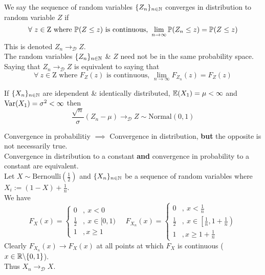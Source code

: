 \documentclass[11pt,a4paper]{article}
\begin{document}
We say the sequence of random variables $\{Z_n\}_{n\in\mathbb{N}}$ converges in distribution to random variable $Z$ if
$$\forall\ z\in\text{Z where }\mathbb{P}(Z\leq z)\text{ is continuous, }\lim_{n\to\infty}\mathbb{P}(Z_n\leq z)=\mathbb{P}(Z\leq z)$$
\nb This is denoted $Z_n\to_\mathcal{D} Z$.\\
\nb The random variables $\{Z_n\}_{n\in\mathbb{N}}$ \& $Z$ need not be in the same probability space.\\

Saying that $Z_n\to_\mathcal{D} Z$ is equivalent to saying that
$$\forall\ z\in\text{Z where }F_Z(z)\text{ is continuous, }\lim_{n\to\infty}F_{Z_n}(z)=F_Z(z)$$

If $\{X_n\}_{n\in\mathbb{N}}$ are idependent \& identically distributed, $\mathbb{E}(X_1)=\mu<\infty$ and $\mathrm{Var}(X_1)=\sigma^2<\infty$ then
$$\frac{\sqrt{n}}{\sigma}(Z_n-\mu)\to_\mathcal{D}Z\sim\text{Normal}(0,1)$$

Convergence in probabilitiy $\implies$ Convergence in distribution, \textbf{but} the opposite is not necessarily true.\\

Convergence in distribution to a constant \textbf{and} convergence in probability to a constant are equivalent.\\

\example{}
Let $X\sim\text{Bernoulli}\left(\frac{1}{2}\right)$ and $\{X_n\}_{n\in\mathbb{N}}$ be a sequence of random variables where $X_i:=(1-X)+\frac{1}{n}$.\\
We have
$$F_X(x)=\begin{cases}
0&,\ x<0\\
\frac{1}{2}&,\ x\in[0,1)\\
1&,x\geq1
\end{cases}\quad F_{X_n}(x)=\begin{cases}
0&,\ x<\frac{1}{n}\\
\frac{1}{2}&,\ x\in\left[\frac{1}{n},1+\frac{1}{n}\right)\\
1&,x\geq1+\frac{1}{n}
\end{cases}$$
Clearly $F_{X_n}(x)\to F_X(x)$ at all points at which $F_X$ is continuous (\ie $x\in\mathbb{R}\backslash\{0,1\}$).\\
Thus $X_n\to_\mathcal{D}X$.\\
\end{document}
